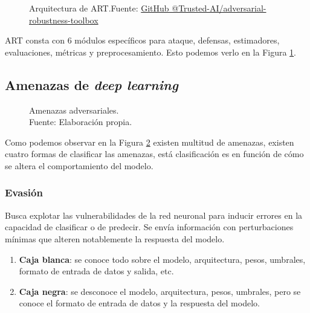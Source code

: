 \begin{figure}[H]
    \centering
    \centerline{}
    \caption{Arquitectura de ART.\newline{}Fuente: \href{https://github.com/Trusted-AI/adversarial-robustness-toolbox/wiki/ART-Architecture-and-Roadmap}{GitHub @Trusted-AI/adversarial-robustness-toolbox}}
    \label{fig:art-architecture}
\end{figure}

ART \cite{art2018} consta con 6 módulos específicos para ataque, defensas, estimadores, evaluaciones, métricas y preprocesamiento. Esto podemos verlo en la Figura \ref{fig:art-architecture}.

\subsection{Amenazas de \textit{deep learning}}
\begin{figure}[H]
    \centering
    \centerline{}
    \caption{Amenazas adversariales.\\Fuente: Elaboración propia.}
    \label{fig:art-adversarial-threats}
\end{figure}

Como podemos observar en la Figura \ref{fig:art-adversarial-threats} existen multitud de amenazas, existen cuatro formas de clasificar las amenazas, está clasificación es en función de cómo se altera el comportamiento del modelo.

\subsubsection{Evasión}

Busca explotar las vulnerabilidades de la red neuronal para inducir errores en la capacidad de clasificar o de predecir. Se envía información con perturbaciones mínimas que alteren notablemente la respuesta del modelo.

\begin{enumerate}
    \item \textbf{Caja blanca}: se conoce todo sobre el modelo, arquitectura, pesos, umbrales, formato de entrada de datos y salida, etc. \cite{learning-machine-learning-part-3-attacking}
    \item \textbf{Caja negra}: se desconoce el modelo, arquitectura, pesos, umbrales, pero se conoce el formato de entrada de datos y la respuesta del modelo. \cite{learning-machine-learning-part-3-attacking}
\end{enumerate}

